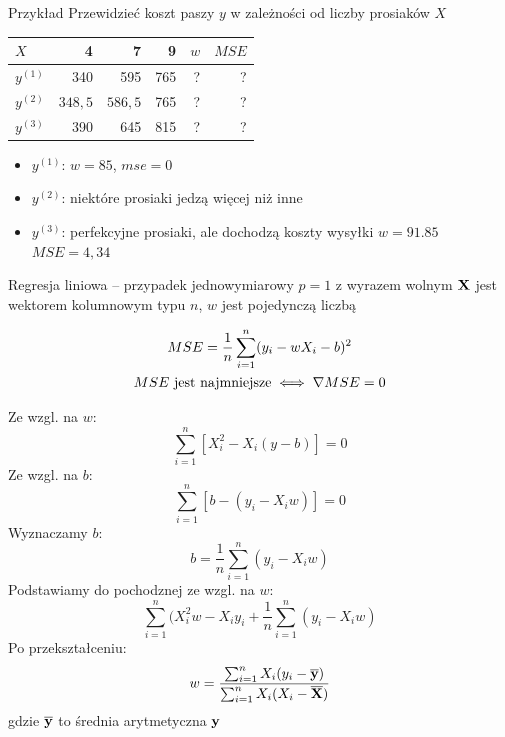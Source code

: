 \documentclass{sa}
\renewcommand{\vec}[1]{\ensuremath\mathbf{#1}}
\newcommand{\grad}{\ensuremath\nabla}
\let\avg\overline
\begin{document}
\begin{frame}{Przykład}
Przewidzieć \alert{koszt paszy $y$} w zależności od \alert{liczby prosiaków $X$}

\begin{center}
\begin{tabular}{l|rrr|rr}
$X$ & 4 & 7 & 9 & $w$ & $MSE$ \\
\hline
$y^{(1)}$ & 340 & 595 & 765 & \alert{?} & \alert{?} \\
\pause
$y^{(2)}$ & $348{,}5$ & $586{,}5$ & 765 & \alert{?} & \alert{?} \\
\pause
$y^{(3)}$ & 390 & 645 & 815 & \alert{?} & \alert{?} \\
\end{tabular}
\end{center}

{
\begin{itemize}
\item $y^{(1)}$: $w=85$, $mse=0$
\item $y^{(2)}$: niektóre prosiaki jedzą więcej niż inne
\item $y^{(3)}$: perfekcyjne prosiaki, ale dochodzą koszty wysyłki $w=91{.}85$ $MSE=4{,}34$
\end{itemize}
}
\end{frame}

\begin{frame}{Regresja liniowa -- przypadek jednowymiarowy $p=1$ z wyrazem wolnym}
$\vec{X}$ jest wektorem kolumnowym typu $n$, $w$ jest pojedynczą liczbą

\begin{gather*}
MSE=\frac{1}{n}\sum_{i=1}^n (y_i-wX_i-b)^2  \\
MSE \text{ jest najmniejsze} \iff \grad MSE = 0
\end{gather*}

{
Ze wzgl. na $w$: \[\sum_{i=1}^n \left[X_i^2-X_i(y-b)\right] = 0\]
Ze wzgl. na $b$: \[\sum_{i=1}^n \left[b-(y_i-X_iw)\right] = 0\]
Wyznaczamy $b$:
\[b=\frac{1}{n}\sum_{i=1}^n (y_i-X_iw) \]
Podstawiamy do pochodznej ze wzgl. na $w$:
\[\sum_{i=1}^n(X_i^2w-X_iy_i+\frac{1}{n}\sum_{i=1}^n (y_i-X_iw) \]
}
{
Po przekształceniu:
\[w=\frac{\sum_{i=1}^n X_i(y_i-\avg{\vec{y}})}{\sum_{i=1}^n X_i(X_i-\avg{\vec{X}})} \]
gdzie $\avg{\vec{y}}$ to średnia arytmetyczna $\vec{y}$
}
\end{frame}
\end{document}
